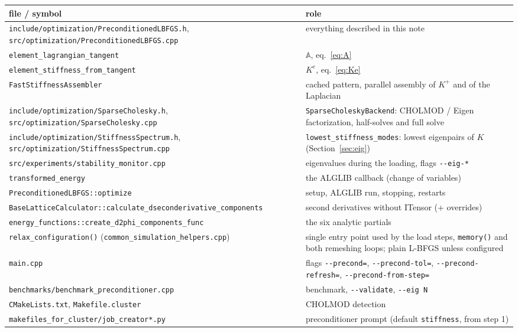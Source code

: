 \documentclass[11pt,a4paper]{article}
\theoremstyle{remark}
\newcommand{\code}[1]{\texttt{#1}}
\begin{document}
\begin{center}
\begin{tabular}{p{6.2cm}p{8.3cm}}
\toprule
file / symbol & role\\
\midrule
\code{include/\allowbreak{}optimization/\allowbreak{}PreconditionedLBFGS.h}, \code{src/\allowbreak{}optimization/\allowbreak{}PreconditionedLBFGS.cpp} & everything described in this note\\
\quad\code{element\_\allowbreak{}lagrangian\_\allowbreak{}tangent} & $\mathbb{A}$, eq.~\eqref{eq:A}\\
\quad\code{element\_\allowbreak{}stiffness\_\allowbreak{}from\_\allowbreak{}tangent} & $K^e$, eq.~\eqref{eq:Ke}\\
\quad\code{FastStiffnessAssembler} & cached pattern, parallel assembly of $K^+$ and of the Laplacian\\
\code{include/\allowbreak{}optimization/\allowbreak{}SparseCholesky.h}, \code{src/\allowbreak{}optimization/\allowbreak{}SparseCholesky.cpp} & \code{SparseCholeskyBackend}: CHOLMOD / Eigen factorization, half-solves and full solve\\
\code{include/\allowbreak{}optimization/\allowbreak{}StiffnessSpectrum.h}, \code{src/\allowbreak{}optimization/\allowbreak{}StiffnessSpectrum.cpp} & \code{lowest\_\allowbreak{}stiffness\_\allowbreak{}modes}: lowest eigenpairs of $K$ (Section~\ref{sec:eig})\\
\code{src/\allowbreak{}experiments/\allowbreak{}stability\_\allowbreak{}monitor.cpp} & eigenvalues during the loading, flags \code{-{}-eig-*}\\
\quad\code{transformed\_\allowbreak{}energy} & the ALGLIB callback (change of variables)\\
\quad\code{PreconditionedLBFGS::\allowbreak{}optimize} & setup, ALGLIB run, stopping, restarts\\
\code{BaseLatticeCalculator::\allowbreak{}calculate\_\allowbreak{}dseconderivative\_\allowbreak{}components} & second derivatives without ITensor (+ overrides)\\
\code{energy\_\allowbreak{}functions::\allowbreak{}create\_\allowbreak{}d2phi\_\allowbreak{}components\_\allowbreak{}func} & the six analytic partials\\
\code{relax\_\allowbreak{}configuration()} (\code{common\_\allowbreak{}simulation\_\allowbreak{}helpers.cpp}) & single entry point used by the load steps, \code{memory()} and both remeshing loops; plain L-BFGS unless configured\\
\code{main.cpp} & flags \code{-{}-precond=}, \code{-{}-precond-tol=}, \code{-{}-precond-refresh=}, \code{-{}-precond-from-step=}\\
\code{benchmarks/\allowbreak{}benchmark\_\allowbreak{}preconditioner.cpp} & benchmark, \code{-{}-validate}, \code{-{}-eig N}\\
\code{CMakeLists.txt}, \code{Makefile.cluster} & CHOLMOD detection\\
\code{makefiles\_\allowbreak{}for\_\allowbreak{}cluster/\allowbreak{}job\_\allowbreak{}creator*.py} & preconditioner prompt (default \code{stiffness}, from step 1)\\
\bottomrule
\end{tabular}
\end{center}
\end{document}

